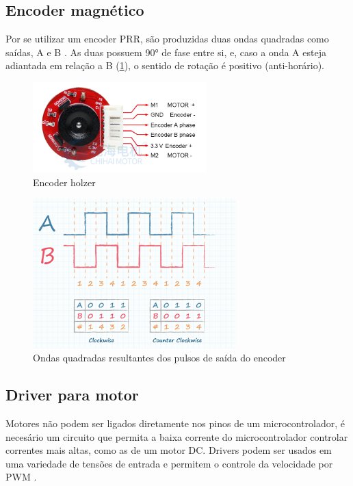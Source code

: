 \subsection{Encoder magnético}

	Por se utilizar um encoder PRR, são produzidas duas ondas quadradas como saídas,
	A e B \cite{encoder_ppr}. As duas possuem 90° de fase entre si, e, caso a onda A
	esteja adiantada em relação a B (\ref{encoder_ppr_ab}), o sentido de rotação é
	positivo (anti-horário).

\begin{figure}[h]
	\centering
	\includegraphics[width=0.6\textwidth]{figures/encoder_holzer}
	\caption{Encoder holzer \cite{motor_dc_6v_encoder}}
\end{figure}

\begin{figure}[h]
	\centering
	\includegraphics[width=0.7\textwidth]{figures/encoder_pulso_ab}
	\caption{Ondas quadradas resultantes dos pulsos de saída do encoder \cite{encoder_ppr}}
	\label{encoder_ppr_ab}
\end{figure}


\subsection{Driver para motor}

	Motores não podem ser ligados diretamente nos pinos de um microcontrolador, 
	é necesário um circuito que permita a baixa corrente do microcontrolador controlar correntes mais altas, como as de um motor DC.
	Drivers podem ser usados em uma variedade de tensões de entrada e permitem o controle da velocidade por PWM \cite{toshiba_ponte_h}.

